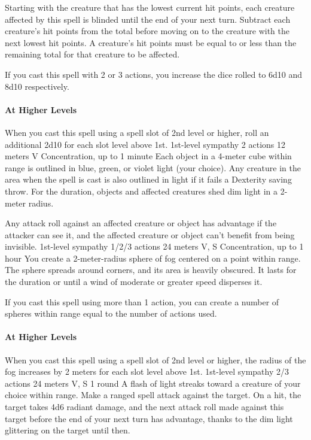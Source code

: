        Starting with the creature that has the lowest current hit points, each creature affected by this spell is blinded until the end of your next turn.
        Subtract each creature's hit points from the total before moving on to the creature with the next lowest hit points.
        A creature's hit points must be equal to or less than the remaining total for that creature to be affected.

        If you cast this spell with 2 or 3 actions, you increase the dice rolled to 6d10 and 8d10 respectively.

        \paragraph{At Higher Levels}
        When you cast this spell using a spell slot of 2nd level or higher, roll an additional 2d10 for each slot level above 1st.
        {1st-level sympathy}
        {2 actions}
        {12 meters}
        {V}
        {Concentration, up to 1 minute}
        Each object in a 4-meter cube within range is outlined in blue, green, or violet light (your choice).
        Any creature in the area when the spell is cast is also outlined in light if it fails a Dexterity saving throw.
        For the duration, objects and affected creatures shed dim light in a 2-meter radius.

        Any attack roll against an affected creature or object has advantage if the attacker can see it, and the affected creature or object can't benefit from being invisible.
        {1st-level sympathy}
        {1/2/3 actions}
        {24 meters}
        {V, S}
        {Concentration, up to 1 hour}
        You create a 2-meter-radius sphere of fog centered on a point within range.
        The sphere spreads around corners, and its area is heavily obscured.
        It lasts for the duration or until a wind of moderate or greater speed disperses it.

        If you cast this spell using more than 1 action, you can create a number of spheres within range equal to the number of actions used.

        \paragraph{At Higher Levels}
        When you cast this spell using a spell slot of 2nd level or higher, the radius of the fog increases by 2 meters for each slot level above 1st.
        {1st-level sympathy}
        {2/3 actions}
        {24 meters}
        {V, S}
        {1 round}
        A flash of light streaks toward a creature of your choice within range.
        Make a ranged spell attack against the target.
        On a hit, the target takes 4d6 radiant damage, and the next attack roll made against this target before the end of your next turn has advantage, thanks to the dim light glittering on the target until then.

